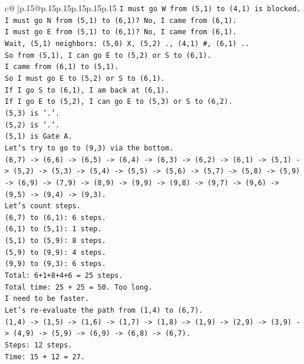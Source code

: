 \documentclass{article}
\begin{document}
{\begin{supertabular}{c@{$\;$}|p{.15\linewidth}@{}p{.15\linewidth}p{.15\linewidth}p{.15\linewidth}p{.15\linewidth}p{.15\linewidth}}
{{{\texttt{I must go W from (5,1) to (4,1) is blocked.} \\
\texttt{I must go N from (5,1) to (6,1)? No, I came from (6,1).} \\
\texttt{I must go E from (5,1) to (6,1)? No, I came from (6,1).} \\
\texttt{Wait, (5,1) neighbors: (5,0) X, (5,2) ., (4,1) \#, (6,1) ..} \\
\texttt{So from (5,1), I can go E to (5,2) or S to (6,1).} \\
\texttt{I came from (6,1) to (5,1).} \\
\texttt{So I must go E to (5,2) or S to (6,1).} \\
\texttt{If I go S to (6,1), I am back at (6,1).} \\
\texttt{If I go E to (5,2), I can go E to (5,3) or S to (6,2).} \\
\texttt{(5,3) is '.'.} \\
\texttt{(5,2) is '.'.} \\
\texttt{(5,1) is Gate A.} \\
\texttt{Let's try to go to (9,3) via the bottom.} \\
\texttt{(6,7) {-}> (6,6) {-}> (6,5) {-}> (6,4) {-}> (6,3) {-}> (6,2) {-}> (6,1) {-}> (5,1) {-}> (5,2) {-}> (5,3) {-}> (5,4) {-}> (5,5) {-}> (5,6) {-}> (5,7) {-}> (5,8) {-}> (5,9) {-}> (6,9) {-}> (7,9) {-}> (8,9) {-}> (9,9) {-}> (9,8) {-}> (9,7) {-}> (9,6) {-}> (9,5) {-}> (9,4) {-}> (9,3).} \\
\texttt{Let's count steps.} \\
\texttt{(6,7) to (6,1): 6 steps.} \\
\texttt{(6,1) to (5,1): 1 step.} \\
\texttt{(5,1) to (5,9): 8 steps.} \\
\texttt{(5,9) to (9,9): 4 steps.} \\
\texttt{(9,9) to (9,3): 6 steps.} \\
\texttt{Total: 6+1+8+4+6 = 25 steps.} \\
\texttt{Total time: 25 + 25 = 50. Too long.} \\
\texttt{I need to be faster.} \\
\texttt{Let's re{-}evaluate the path from (1,4) to (6,7).} \\
\texttt{(1,4) {-}> (1,5) {-}> (1,6) {-}> (1,7) {-}> (1,8) {-}> (1,9) {-}> (2,9) {-}> (3,9) {-}> (4,9) {-}> (5,9) {-}> (6,9) {-}> (6,8) {-}> (6,7).} \\
\texttt{Steps: 12 steps.} \\
\texttt{Time: 15 + 12 = 27.} \\
}}}
\end{supertabular}}
\end{document}
